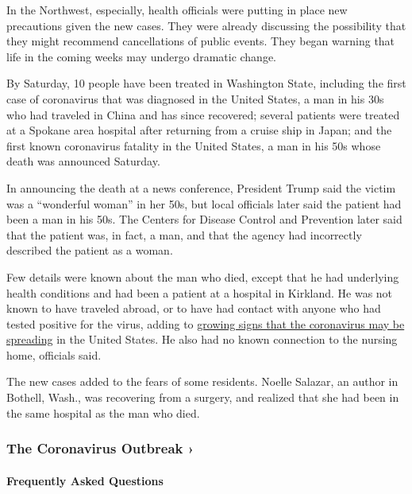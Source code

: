 In the Northwest, especially, health officials were putting in place new
precautions given the new cases. They were already discussing the
possibility that they might recommend cancellations of public events.
They began warning that life in the coming weeks may undergo dramatic
change.

By Saturday, 10 people have been treated in Washington State, including
the first case of coronavirus that was diagnosed in the United States, a
man in his 30s who had traveled in China and has since recovered;
several patients were treated at a Spokane area hospital after returning
from a cruise ship in Japan; and the first known coronavirus fatality in
the United States, a man in his 50s whose death was announced Saturday.

In announcing the death at a news conference, President Trump said the
victim was a ``wonderful woman'' in her 50s, but local officials later
said the patient had been a man in his 50s. The Centers for Disease
Control and Prevention later said that the patient was, in fact, a man,
and that the agency had incorrectly described the patient as a woman.

Few details were known about the man who died, except that he had
underlying health conditions and had been a patient at a hospital in
Kirkland. He was not known to have traveled abroad, or to have had
contact with anyone who had tested positive for the virus, adding to
\href{https://www.nytimes3xbfgragh.onion/2020/02/28/us/coronavirus-solano-county.html}{growing
signs that the coronavirus may be spreading} in the United States. He
also had no known connection to the nursing home, officials said.

The new cases added to the fears of some residents. Noelle Salazar, an
author in Bothell, Wash., was recovering from a surgery, and realized
that she had been in the same hospital as the man who died.

\href{https://www.nytimes3xbfgragh.onion/news-event/coronavirus?action=click\&pgtype=Article\&state=default\&region=MAIN_CONTENT_3\&context=storylines_faq}{}

\hypertarget{the-coronavirus-outbreak-}{%
\subsubsection{The Coronavirus Outbreak
›}\label{the-coronavirus-outbreak-}}

\hypertarget{frequently-asked-questions}{%
\paragraph{Frequently Asked
Questions}\label{frequently-asked-questions}}


